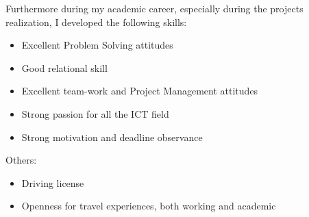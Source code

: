 \vspace{0.5em}
Furthermore during my academic career, especially during the projects realization, I developed the following skills:
\begin{itemize}
	\item Excellent Problem Solving attitudes
	\item Good relational skill
	\item Excellent team-work and Project Management attitudes
	\item Strong passion for all the ICT field
	\item Strong motivation and deadline observance
\end{itemize}
\vspace{1em}
Others:
\begin{itemize}
	\item Driving license
	\item Openness for travel experiences, both working and academic
\end{itemize}
